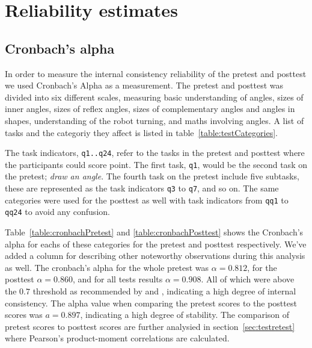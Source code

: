 \section{Reliability estimates}\label{ch:cronbach}
\subsection*{Cronbach's alpha}
In order to measure the internal consistency reliability of the pretest and posttest we used Cronbach's Alpha as a measurement. 
The pretest and posttest was divided into six different scales, measuring
basic understanding of angles, sizes of inner angles, sizes of reflex angles, sizes of complementary angles and angles in shapes, understanding of the robot turning, and maths involving angles. A list of tasks and the categoriy they affect is listed in table~\ref{table:testCategories}. 

\bigskip\noindent
The task indicators, \texttt{q1..q24}, refer to the tasks in the pretest and posttest where the participants could score point. The first task, \texttt{q1}, would be the second task on the pretest; \textit{draw an angle}. The fourth task on the pretest include five subtasks, these are represented as the task indicators \texttt{q3} to \texttt{q7}, and so on.
The same categories were used for the posttest as well with task indicators from \texttt{qq1} to \texttt{qq24} to avoid any confusion.


\bigskip\noindent
Table~\ref{table:cronbachPretest} and \ref{table:cronbachPosttest} shows the Cronbach's alpha for eachs of these categories for the pretest and posttest respectively. We've added a column for describing other noteworthy observations during this analysis as well. 
The cronbach's alpha for the whole pretest was $\alpha = 0.812$, for the posttest $\alpha = 0.860$, and for all tests results $\alpha = 0.908$.
All of which were above the $0.7$ threshold as recommended by \cite{devellis2003scale} and \cite{kline2005principles}, indicating a high degree of internal consistency. The alpha value when comparing the pretest scores to the posttest scores was $a = 0.897$, indicating a high degree of stability.	The comparison of pretest scores to posttest scores are further analysied in section~\ref{sec:testretest} where Pearson's product-moment correlations are calculated.


